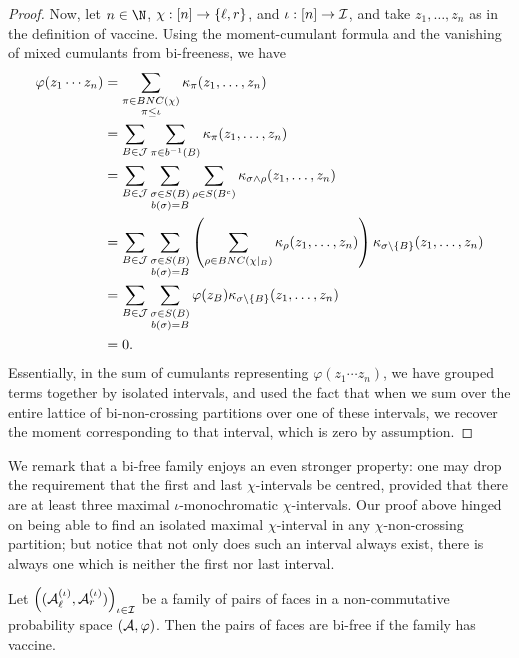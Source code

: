 \begin{proof}
	Now, let $n \in \N$, $\chi : [n] \to \left\{\ell, r\right\}$, and $\iota : [n] \to \mathcal{I}$, and take $z_1, \ldots, z_n$ as in the definition of vaccine.
	Using the moment-cumulant formula and the vanishing of mixed cumulants from bi-freeness, we have
	\begin{align*}
		\varphi(z_1\cdots z_n)
		&= \sum_{\substack{\pi \in BNC(\chi)\\ \pi \leq \iota}} \kappa_\pi(z_1, \ldots, z_n)\\
		&= \sum_{B \in \mathcal{J}} \sum_{\pi \in b^{-1}(B)} \kappa_\pi(z_1, \ldots, z_n)\\
		&= \sum_{B \in \mathcal{J}} \sum_{\substack{\sigma \in S(B)\\ b(\sigma) = B}}\sum_{\rho \in S(B^c)} \kappa_{\sigma\wedge\rho}(z_1, \ldots, z_n)\\
		&= \sum_{B \in \mathcal{J}} \sum_{\substack{\sigma \in S(B)\\ b(\sigma) = B}}\left(\sum_{\rho \in BNC(\chi|_B)}\kappa_\rho(z_1, \ldots, z_n)\right) \kappa_{\sigma\setminus \left\{B\right\}}(z_1, \ldots, z_n)\\
		&= \sum_{B \in \mathcal{J}} \sum_{\substack{\sigma \in S(B)\\ b(\sigma) = B}}\varphi(z_B) \kappa_{\sigma\setminus \left\{B\right\}}(z_1, \ldots, z_n)\\
		&= 0.
	\end{align*}
	Essentially, in the sum of cumulants representing $\varphi(z_1\cdots z_n)$, we have grouped terms together by isolated intervals, and used the fact that when we sum over the entire lattice of bi-non-crossing partitions over one of these intervals, we recover the moment corresponding to that interval, which is zero by assumption.
\end{proof}
We remark that a bi-free family enjoys an even stronger property: one may drop the requirement that the first and last $\chi$-intervals be centred, provided that there are at least three maximal $\iota$-monochromatic $\chi$-intervals.
Our proof above hinged on being able to find an isolated maximal $\chi$-interval in any $\chi$-non-crossing partition; but notice that not only does such an interval always exist, there is always one which is neither the first nor last interval.

\begin{lemma}
	\label{lem:vaccineimpliesbifree}
	Let $\left((\mathcal{A}_\ell^{(\iota)}, \mathcal{A}_r^{(\iota)})\right)_{\iota \in \mathcal{I}}$ be a family of pairs of faces in a non-commutative probability space $(\mathcal{A}, \varphi)$.
	Then the pairs of faces are bi-free if the family has vaccine{}.
\end{lemma}

